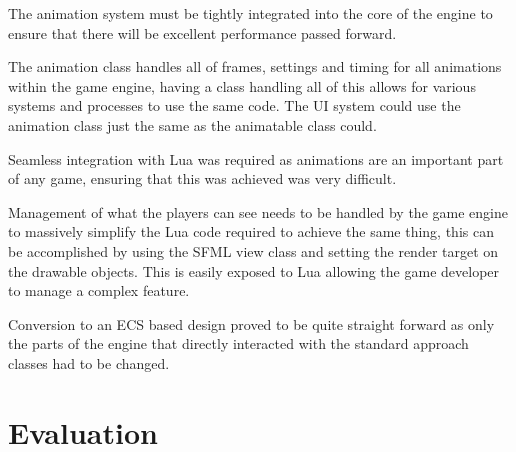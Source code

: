 \documentclass[11pt,a4paper,titlepage]{report}
\begin{document}
    The animation system must be tightly integrated into the core of the engine to ensure that there will be excellent performance passed forward.

    The animation class handles all of frames, settings and timing for all animations within the game engine, having a class handling all of this allows for various systems and processes to use the same code. The UI system could use the animation class just the same as the animatable class could.

    Seamless integration with Lua was required as animations are an important part of any game, ensuring that this was achieved was very difficult.


    Management of what the players can see needs to be handled by the game engine to massively simplify the Lua code required to achieve the same thing, this can be accomplished by using the SFML view class and setting the render target on the drawable objects. This is easily exposed to Lua allowing the game developer to manage a complex feature.





    Conversion to an ECS based design proved to be quite straight forward as only the parts of the engine that directly interacted with the standard approach classes had to be changed.





















\chapter{Evaluation}
\end{document}
